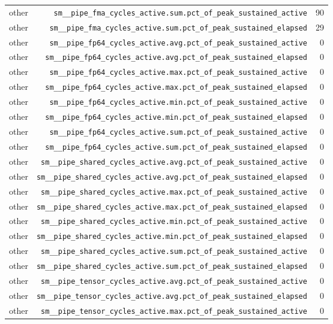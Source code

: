 \begin{table}[h]
\begin{tabular}{|l|r|r|}
other & \texttt{sm__pipe_fma_cycles_active.sum.pct_of_peak_sustained_active} & 90 \\
other & \texttt{sm__pipe_fma_cycles_active.sum.pct_of_peak_sustained_elapsed} & 29 \\
other & \texttt{sm__pipe_fp64_cycles_active.avg.pct_of_peak_sustained_active} & 0 \\
other & \texttt{sm__pipe_fp64_cycles_active.avg.pct_of_peak_sustained_elapsed} & 0 \\
other & \texttt{sm__pipe_fp64_cycles_active.max.pct_of_peak_sustained_active} & 0 \\
other & \texttt{sm__pipe_fp64_cycles_active.max.pct_of_peak_sustained_elapsed} & 0 \\
other & \texttt{sm__pipe_fp64_cycles_active.min.pct_of_peak_sustained_active} & 0 \\
other & \texttt{sm__pipe_fp64_cycles_active.min.pct_of_peak_sustained_elapsed} & 0 \\
other & \texttt{sm__pipe_fp64_cycles_active.sum.pct_of_peak_sustained_active} & 0 \\
other & \texttt{sm__pipe_fp64_cycles_active.sum.pct_of_peak_sustained_elapsed} & 0 \\
other & \texttt{sm__pipe_shared_cycles_active.avg.pct_of_peak_sustained_active} & 0 \\
other & \texttt{sm__pipe_shared_cycles_active.avg.pct_of_peak_sustained_elapsed} & 0 \\
other & \texttt{sm__pipe_shared_cycles_active.max.pct_of_peak_sustained_active} & 0 \\
other & \texttt{sm__pipe_shared_cycles_active.max.pct_of_peak_sustained_elapsed} & 0 \\
other & \texttt{sm__pipe_shared_cycles_active.min.pct_of_peak_sustained_active} & 0 \\
other & \texttt{sm__pipe_shared_cycles_active.min.pct_of_peak_sustained_elapsed} & 0 \\
other & \texttt{sm__pipe_shared_cycles_active.sum.pct_of_peak_sustained_active} & 0 \\
other & \texttt{sm__pipe_shared_cycles_active.sum.pct_of_peak_sustained_elapsed} & 0 \\
other & \texttt{sm__pipe_tensor_cycles_active.avg.pct_of_peak_sustained_active} & 0 \\
other & \texttt{sm__pipe_tensor_cycles_active.avg.pct_of_peak_sustained_elapsed} & 0 \\
other & \texttt{sm__pipe_tensor_cycles_active.max.pct_of_peak_sustained_active} & 0 \\

\end{tabular}
\end{table}
